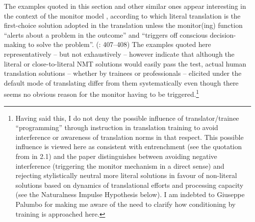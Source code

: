 \documentclass[output=paper]{langscibook}
\begin{document}
The examples quoted in this section and other similar ones appear interesting in the context of the monitor model \citep{Tirkkonen-Condit2005}, according to which literal translation is the first-choice solution adopted in the translation unless the monitor(ing) function “alerts about a problem in the outcome” and “triggers off conscious decision-making to solve the problem”. (\citealt{Tirkkonen-Condit2005}: 407–408) The examples quoted here representatively – but not exhaustively – however indicate that although the literal or close-to-literal NMT solutions would easily pass the test, actual human translation solutions – whether by trainees or professionals – elicited under the default mode of translating differ from them systematically even though there seems no obvious reason for the monitor having to be triggered.\footnote{Having
  said this, I do not deny the possible influence of translator/trainee “programming” through instruction in translation training to avoid interference or awareness of translation norms in that respect. This possible influence is viewed here as consistent with entrenchment (see the quotation from \citet{Halverson2019} in 2.1) and the paper distinguishes between avoiding negative interference (triggering the monitor mechanism in a direct sense) and rejecting stylistically neutral more literal solutions in favour of non-literal solutions based on dynamics of translational efforts and processing capacity (see the Naturalness Impulse Hypothesis below). I am indebted to Giuseppe Palumbo for making me aware of the need to clarify how conditioning by training is approached here.
}
\end{document}
